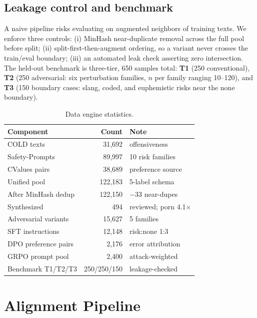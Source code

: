 \documentclass[11pt]{article}
\begin{document}
\subsection{Leakage control and benchmark}
A naive pipeline risks evaluating on augmented neighbors of training texts. We enforce three controls: (i) MinHash near-duplicate removal across the full pool before split; (ii) split-first-then-augment ordering, so a variant never crosses the train/eval boundary; (iii) an automated leak check asserting zero intersection. The held-out benchmark is three-tier, 650 samples total: \textbf{T1} (250 conventional), \textbf{T2} (250 adversarial: six perturbation families, $n$ per family ranging 10--120), and \textbf{T3} (150 boundary cases: slang, coded, and euphemistic risks near the none boundary).

\begin{table}[t]
\centering\footnotesize
\setlength{\tabcolsep}{3pt}
\begin{tabular}{lrl}
\toprule
Component & Count & Note \\
\midrule
COLD texts & 31{,}692 & offensiveness \\
Safety-Prompts & 89{,}997 & 10 risk families \\
CValues pairs & 38{,}689 & preference source \\
\midrule
Unified pool & 122{,}183 & 5-label schema \\
After MinHash dedup & 122{,}150 & $-$33 near-dupes \\
Synthesized & 494 & reviewed; porn 4.1$\times$ \\
Adversarial variants & 15{,}627 & 5 families \\
\midrule
SFT instructions & 12{,}148 & risk:none 1:3 \\
DPO preference pairs & 2{,}176 & error attribution \\
GRPO prompt pool & 2{,}400 & attack-weighted \\
\midrule
Benchmark T1/T2/T3 & 250/250/150 & leakage-checked \\
\bottomrule
\end{tabular}
\caption{Data engine statistics.}
\label{tab:data}
\end{table}

\section{Alignment Pipeline}
\end{document}
